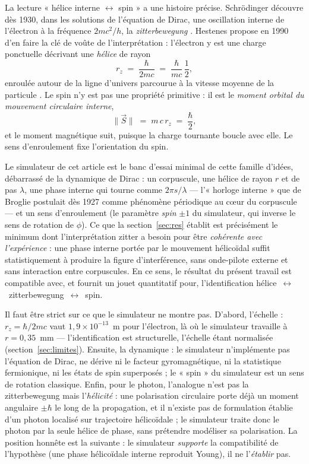 La lecture « hélice interne $\leftrightarrow$ spin » a une histoire précise.
Schrödinger découvre dès 1930, dans les solutions de l'équation de Dirac, une
oscillation interne de l'électron à la fréquence $2mc^2/h$, la
\emph{zitterbewegung} \cite{schrodinger1930}. Hestenes propose en 1990 d'en faire
la clé de voûte de l'interprétation : l'électron y est une charge ponctuelle
décrivant une \emph{hélice} de rayon
\begin{equation}\label{eq:rz}
  r_z \;=\; \frac{\hbar}{2mc} \;=\; \frac{\hbar}{m c}\,\frac{1}{2},
\end{equation}
enroulée autour de la ligne d'univers parcourue à la vitesse moyenne de la
particule \cite{hestenes1990}. Le spin n'y est pas une propriété primitive : il
est le \emph{moment orbital du mouvement circulaire interne},
\begin{equation}\label{eq:spin}
  \lVert \vec S \rVert \;=\; m\,c\,r_z \;=\; \frac{\hbar}{2},
\end{equation}
et le moment magnétique suit, puisque la charge tournante boucle avec elle. Le
sens d'enroulement fixe l'orientation du spin.

Le simulateur de cet article est le banc d'essai minimal de cette famille
d'idées, débarrassé de la dynamique de Dirac : un corpuscule, une hélice de
rayon $r$ et de pas $\lambda$, une phase interne qui tourne comme $2\pi s/
\lambda$ --- l'« horloge interne » que de Broglie postulait dès 1927 comme
phénomène périodique au cœur du corpuscule \cite{debroglie1927} --- et un sens
d'enroulement (le paramètre \emph{spin} $\pm 1$ du simulateur, qui inverse le sens
de rotation de $\phi$). Ce que la section~\ref{sec:res} établit est précisément
le minimum dont l'interprétation zitter a besoin pour être \emph{cohérente avec
l'expérience} : une phase interne portée par le mouvement hélicoïdal suffit
statistiquement à produire la figure d'interférence, sans onde-pilote externe et
sans interaction entre corpuscules. En ce sens, le résultat du présent travail
est compatible avec, et fournit un jouet quantitatif pour, l'identification
hélice~$\leftrightarrow$~zitterbewegung~$\leftrightarrow$~spin.

Il faut être strict sur ce que le simulateur ne montre pas. D'abord,
l'échelle : $r_z = \hbar/2mc$ vaut $1{,}9\times10^{-13}$~m pour l'électron, là
où le simulateur travaille à $r = 0{,}35$~mm --- l'identification est
structurelle, l'échelle étant normalisée (section~\ref{sec:limites}).
Ensuite, la dynamique : le simulateur n'implémente pas l'équation de Dirac, ne
dérive ni le facteur gyromagnétique, ni la statistique fermionique, ni les états
de spin superposés ; le « spin » du simulateur est un sens de rotation classique.
Enfin, pour le photon, l'analogue n'est pas la zitterbewegung mais
l'\emph{hélicité} : une polarisation circulaire porte déjà un moment angulaire
$\pm\hbar$ le long de la propagation, et il n'existe pas de formulation établie
d'un photon localisé sur trajectoire hélicoïdale ; le simulateur traite donc le
photon par la seule hélice de phase, sans prétendre modéliser sa polarisation.
La position honnête est la suivante : le simulateur \emph{supporte} la
compatibilité de l'hypothèse (une phase hélicoïdale interne reproduit Young), il
ne l'\emph{établir} pas.

